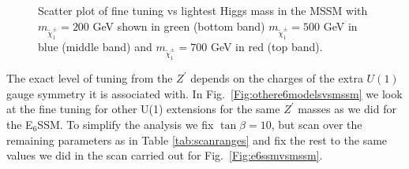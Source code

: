 \documentclass[preprint,amsmath,amssymb,aps,superscriptaddress,prd,showpacs,floatfix,nofootinbib]{revtex4-1}
\begin{document}
\begin{figure}[h]
\begin{center}
\caption{Scatter plot of fine tuning vs lightest Higgs mass in the MSSM with $m_{\tilde{\chi}^\pm_1} = 200$ GeV shown in green 
(bottom band) $m_{\tilde{\chi}^\pm_1} = 500$ GeV in blue (middle band) and $m_{\tilde{\chi}^\pm_1} = 700$ GeV in red
(top band).}
\label{Fig:chargino-plot}
\end{center}
\end{figure}

The exact level of tuning from the $Z^\prime$ depends on the charges
of the extra $U(1)$ gauge symmetry it is associated with.  In
Fig.~\ref{Fig:othere6modelsvsmssm} we look at the fine tuning for
other U(1) extensions for the same $Z^\prime$ masses as we did for the
E$_6$SSM.  To simplify the analysis we fix $\tan \beta = 10$, but scan
over the remaining parameters as in Table \ref{tab:scanranges} and fix
the rest to the same values we did in the scan carried out for
Fig.~\ref{Fig:e6ssmvsmssm}.
\end{document}
